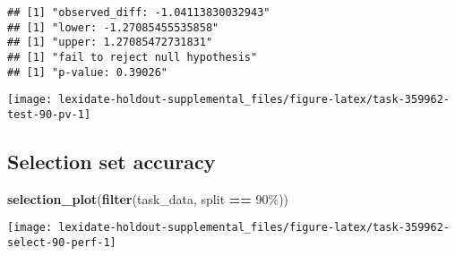 \documentclass[
]{book}
\newenvironment{Shaded}{\begin{snugshade}}{\end{snugshade}}
\newcommand{\AttributeTok}[1]{\textcolor[rgb]{0.13,0.29,0.53}{#1}}
\newcommand{\DecValTok}[1]{\textcolor[rgb]{0.00,0.00,0.81}{#1}}
\newcommand{\FunctionTok}[1]{\textcolor[rgb]{0.13,0.29,0.53}{\textbf{#1}}}
\newcommand{\NormalTok}[1]{#1}
\newcommand{\OtherTok}[1]{\textcolor[rgb]{0.56,0.35,0.01}{#1}}
\newcommand{\SpecialCharTok}[1]{\textcolor[rgb]{0.81,0.36,0.00}{\textbf{#1}}}
\newcommand{\StringTok}[1]{\textcolor[rgb]{0.31,0.60,0.02}{#1}}
\begin{document}
\begin{Shaded}
\end{Shaded}

\begin{verbatim}
## [1] "observed_diff: -1.04113830032943"
## [1] "lower: -1.27085455535858"
## [1] "upper: 1.27085472731831"
## [1] "fail to reject null hypothesis"
## [1] "p-value: 0.39026"
\end{verbatim}

\texttt{[image: lexidate-holdout-supplemental\_files/figure-latex/task-359962-test-90-pv-1]}

\hypertarget{selection-set-accuracy-58}{%
\subsection{Selection set accuracy}\label{selection-set-accuracy-58}}

\begin{Shaded}
\begin{Highlighting}[]
\FunctionTok{selection\_plot}\NormalTok{(}\FunctionTok{filter}\NormalTok{(task\_data, split }\SpecialCharTok{==} \StringTok{\textquotesingle{}90\%\textquotesingle{}}\NormalTok{))}
\end{Highlighting}
\end{Shaded}

\texttt{[image: lexidate-holdout-supplemental\_files/figure-latex/task-359962-select-90-perf-1]}
\end{document}
